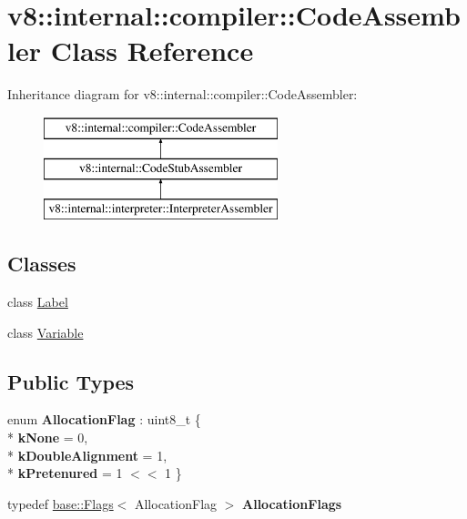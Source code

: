 \hypertarget{classv8_1_1internal_1_1compiler_1_1_code_assembler}{}\section{v8\+:\+:internal\+:\+:compiler\+:\+:Code\+Assembler Class Reference}
\label{classv8_1_1internal_1_1compiler_1_1_code_assembler}
Inheritance diagram for v8\+:\+:internal\+:\+:compiler\+:\+:Code\+Assembler\+:\begin{figure}[H]
\begin{center}
\leavevmode
\includegraphics[height=3.000000cm]{classv8_1_1internal_1_1compiler_1_1_code_assembler}
\end{center}
\end{figure}
\subsection*{Classes}
\begin{DoxyCompactItemize}
\item 
class \hyperlink{classv8_1_1internal_1_1compiler_1_1_code_assembler_1_1_label}{Label}
\item 
class \hyperlink{classv8_1_1internal_1_1compiler_1_1_code_assembler_1_1_variable}{Variable}
\end{DoxyCompactItemize}
\subsection*{Public Types}
\begin{DoxyCompactItemize}
\item 
enum {\bfseries Allocation\+Flag} \+: uint8\+\_\+t \{ \\*
{\bfseries k\+None} = 0, 
\\*
{\bfseries k\+Double\+Alignment} = 1, 
\\*
{\bfseries k\+Pretenured} = 1 $<$$<$ 1
 \}\hypertarget{classv8_1_1internal_1_1compiler_1_1_code_assembler_a49b9812b4253b4e7dc0f099919279881}{}\label{classv8_1_1internal_1_1compiler_1_1_code_assembler_a49b9812b4253b4e7dc0f099919279881}

\item 
typedef \hyperlink{classv8_1_1base_1_1_flags}{base\+::\+Flags}$<$ Allocation\+Flag $>$ {\bfseries Allocation\+Flags}\hypertarget{classv8_1_1internal_1_1compiler_1_1_code_assembler_a874f8fbb502233b7e44d6ee8a1add1a7}{}\label{classv8_1_1internal_1_1compiler_1_1_code_assembler_a874f8fbb502233b7e44d6ee8a1add1a7}

\end{DoxyCompactItemize}
